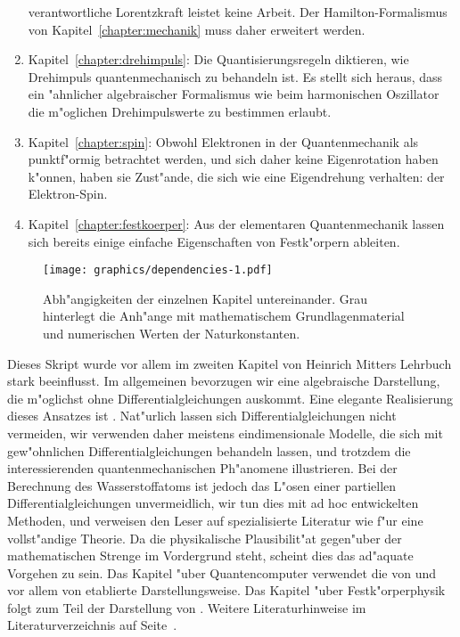 \begin{enumerate}
verantwortliche Lorentzkraft leistet keine Arbeit.
Der Hamilton-Formalismus von Kapitel~\ref{chapter:mechanik} muss
daher erweitert werden.
\item Kapitel~\ref{chapter:drehimpuls}:
Die Quantisierungsregeln diktieren, wie Drehimpuls quantenmechanisch
zu behandeln ist.
Es stellt sich heraus, dass ein "ahnlicher algebraischer Formalismus 
wie beim harmonischen Oszillator die m"oglichen Drehimpulswerte
zu bestimmen erlaubt.
\item Kapitel~\ref{chapter:spin}:
Obwohl Elektronen in der Quantenmechanik als punktf"ormig betrachtet
werden, und sich daher keine Eigenrotation haben k"onnen,
haben sie Zust"ande, die sich wie eine Eigendrehung verhalten:
der Elektron-Spin.
\item Kapitel~\ref{chapter:festkoerper}:
Aus der elementaren Quantenmechanik lassen sich bereits einige
einfache Eigenschaften von Festk"orpern ableiten.
\end{enumerate}

\begin{figure}
\centering
\texttt{[image: graphics/dependencies-1.pdf]}
\caption{Abh"angigkeiten der einzelnen Kapitel untereinander.
Grau hinterlegt die Anh"ange mit mathematischem Grundlagenmaterial
und numerischen Werten der Naturkonstanten.
\label{skript:dependencies}}
\end{figure}

Dieses Skript wurde vor allem im zweiten Kapitel von Heinrich Mitters
Lehrbuch \cite{skript:mitter} stark beeinflusst. 
Im allgemeinen bevorzugen wir eine algebraische Darstellung, die
m"oglichst ohne Differentialgleichungen auskommt.
Eine elegante Realisierung dieses Ansatzes ist \cite{skript:green}.
Nat"urlich lassen sich Differentialgleichungen nicht vermeiden,
wir verwenden daher meistens eindimensionale Modelle, die sich mit
gew"ohnlichen Differentialgleichungen behandeln lassen, und trotzdem
die interessierenden quantenmechanischen Ph"anomene illustrieren.
Bei der Berechnung des Wasserstoffatoms ist jedoch das L"osen einer partiellen
Differentialgleichungen unvermeidlich, wir tun dies mit ad hoc entwickelten
Methoden, und verweisen den Leser auf spezialisierte Literatur wie 
\cite{skript:evans} f"ur eine vollst"andige Theorie.
Da die physikalische Plausibilit"at gegen"uber der mathematischen Strenge
im Vordergrund steht, scheint dies das ad"aquate Vorgehen zu sein.
Das Kapitel "uber Quantencomputer verwendet die von
\cite{skript:kaye-et-al} und vor allem von
\cite{skript:arorabarak} etablierte Darstellungsweise.
Das Kapitel "uber Festk"orperphysik folgt zum Teil der Darstellung von
\cite{skript:madelung1}.
Weitere Literaturhinweise im Literaturverzeichnis auf
Seite~\pageref{skript:literatur}.

